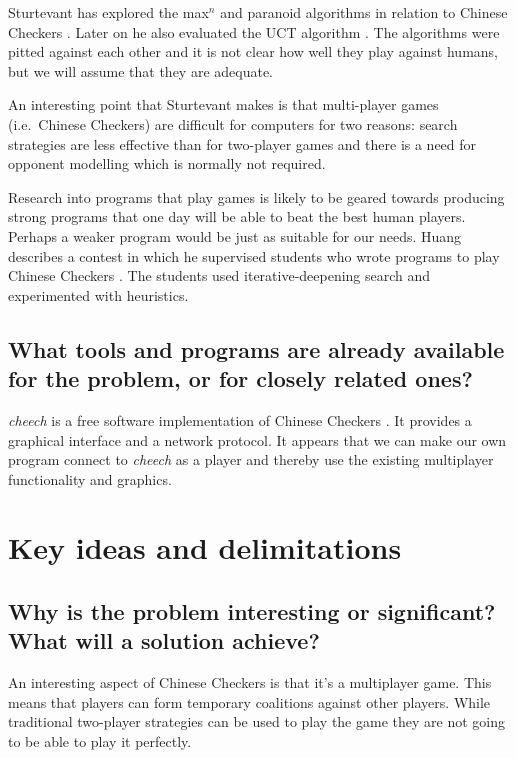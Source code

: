 \documentclass[a4paper,11pt]{report}
\begin{document}
Sturtevant has explored the max$^n$ and paranoid algorithms in
relation to Chinese Checkers
\cite{springerlink:10.1007/978-3-540-40031-8_8}. Later on he also
evaluated the UCT algorithm
\cite{springerlink:10.1007/978-3-540-87608-3_4}. The algorithms were
pitted against each other and it is not clear how well they play
against humans, but we will assume that they are adequate.

An interesting point that Sturtevant makes is that multi-player games
(i.e.~Chinese Checkers) are difficult for computers for two reasons:
search strategies are less effective than for two-player games and
there is a need for opponent modelling which is normally not required.

Research into programs that play games is likely to be geared towards
producing strong programs that one day will be able to beat the best
human players. Perhaps a weaker program would be just as suitable for
our needs. Huang describes a contest in which he supervised students
who wrote programs to play Chinese Checkers
\cite{Huang:2001:SGP:378593.378708}. The students used
iterative-deepening search and experimented with heuristics.

\section{What tools and programs are already available for the problem, or for closely related ones?}

\emph{cheech} is a free software implementation of Chinese Checkers
\cite{cheech}. It provides a graphical interface and a network
protocol. It appears that we can make our own program connect to
\emph{cheech} as a player and thereby use the existing multiplayer
functionality and graphics.

\chapter{Key ideas and delimitations} 
\section{Why is the problem interesting or significant?  What will a solution achieve?}

An interesting aspect of Chinese Checkers is that it's a multiplayer
game. This means that players can form temporary coalitions against
other players. While traditional two-player strategies can be used to
play the game they are not going to be able to play it perfectly.
\end{document}
